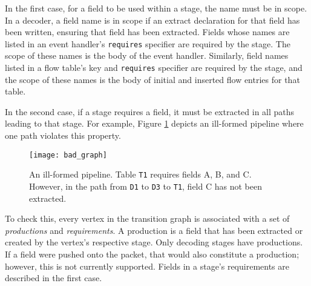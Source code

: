 In the first case, for a field to be used within a stage, the name must be in scope.
In a decoder, a field name is in scope if an extract declaration for that field has been written, ensuring that field has been extracted.
Fields whose names are listed in an event handler's \texttt{requires} specifier are required by the stage. The scope of these names is the body of the event handler.
Similarly, field names listed in a flow table's key and \texttt{requires} specifier are required by the stage, and the scope of these names is the body of initial and inserted flow entries for that table.





In the second case, if a stage requires a field, it must be extracted in all paths leading to that stage.
For example, Figure \ref{fig:bad_graph} depicts an ill-formed pipeline where one path violates this property.

\begin{figure}[ht]
\texttt{[image: bad\_graph]}
\caption{An ill-formed pipeline. Table \texttt{T1} requires fields A, B, and C. However, in the path from \texttt{D1} to \texttt{D3} to \texttt{T1}, field C has not been extracted.}
\label{fig:bad_graph}
\end{figure}

To check this,
every vertex in the transition graph is associated with a set of \textit{productions} and \textit{requirements}.
A production is a field that has been extracted or created by the vertex's respective stage. Only decoding stages have productions. If a field were pushed onto the packet, that would also constitute a production; however, this is not currently supported.
Fields in a stage's requirements are described in the first case. 


